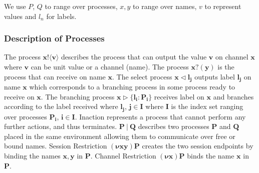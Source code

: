 We use $P$, $Q$ to range over processes, $x, y$ to range over names, $v$ to represent values and $l_n$ for labels. 

\subsubsection{Description of Processes}
The process $\boldsymbol{x!\langle v \rangle}$ describes the process that can output the value $\boldsymbol{v}$ on channel $\boldsymbol{x}$ where $\boldsymbol{v}$ can be unit value or a channel (name). The process $\boldsymbol{x?(y)}$ is the process that can receive on name $\boldsymbol{x}$. The select process $\boldsymbol{x \vartriangleleft l_j}$ outputs label $\boldsymbol{l_j}$ on name $\boldsymbol{x}$ which corresponds to a branching process in some process ready to receive on $\boldsymbol{x}$. The branching process $\boldsymbol{x \vartriangleright \{l_i : P_i\}}$ receives label on $\boldsymbol{x}$ and branches according to the label received where $\boldsymbol{l_j}$, $\boldsymbol{j \in I}$ where $\boldsymbol{I}$ is the index set ranging over processes $\boldsymbol{P_i}$, $\boldsymbol{i \in I}$. Inaction represents a process that cannot perform any further actions, and thus terminates. $\boldsymbol{P \: | \: Q}$ describes two processes $\boldsymbol{P}$ and $\boldsymbol{Q}$ placed in the same environment allowing them to communicate over free or bound names. Session Restriction $\boldsymbol{(\nu xy) P}$ creates the two session endpoints by binding the names $\boldsymbol{x, y}$ in $\boldsymbol{P}$. Channel Restriction $\boldsymbol{(\nu x) P}$ binds the name $\boldsymbol{x}$ in $\boldsymbol{P}$. 




